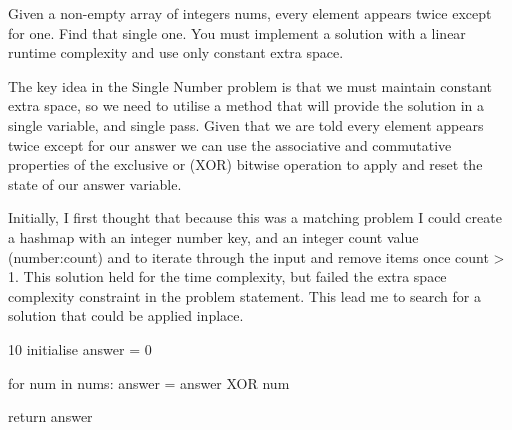 %


\label{prob:lc-136-single-number}

\ProblemSummary
Given a non-empty array of integers nums, every element appears twice except for one. Find that single one. You must implement a solution with a linear runtime complexity and use only constant extra space.

\KeyIdea
The key idea in the Single Number problem is that we must maintain constant extra space, so we need to utilise a method that
will provide the solution in a single variable, and single pass. Given that we are told every element appears twice except for our answer we can use the associative and commutative properties of the exclusive or (XOR) bitwise operation to apply and reset the state of our answer variable.

\begin{Thinking}
Initially, I first thought that because this was a matching problem I could create a hashmap with an integer number key, and an integer count value (number:count) and to iterate through the input and remove items once count > 1. This solution held for the time complexity, but failed the extra space complexity constraint in the problem statement. This lead me to search for a solution that could be applied inplace.
\end{Thinking}

\Algorithm
\begin{CodeBlock}[style=pseudo,caption={Pseudocode}]{10}
  initialise answer = 0
  
  for num in nums:
    answer = answer XOR num
  
  return answer
\end{CodeBlock}

